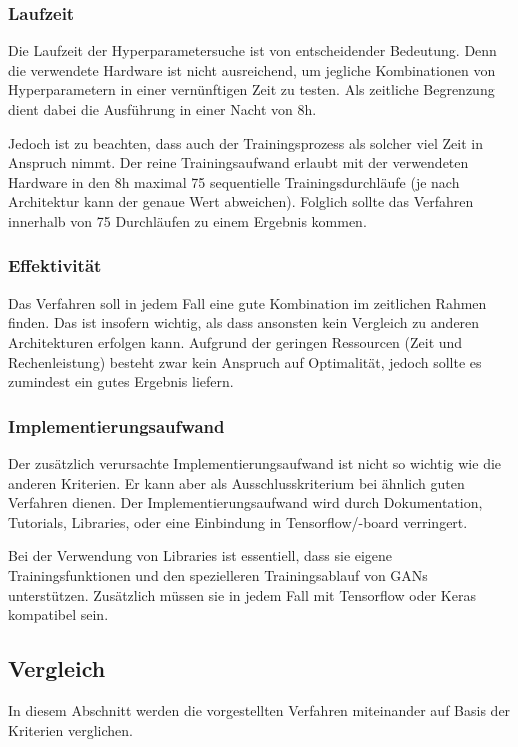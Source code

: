 \subsubsection{Laufzeit}
Die Laufzeit der Hyperparametersuche ist von entscheidender Bedeutung.
Denn die verwendete Hardware ist nicht ausreichend, um jegliche Kombinationen von Hyperparametern in einer vernünftigen Zeit zu testen.
Als zeitliche Begrenzung dient dabei die Ausführung in einer Nacht von 8h.
\newline

Jedoch ist zu beachten, dass auch der Trainingsprozess als solcher viel Zeit in Anspruch nimmt.
Der reine Trainingsaufwand erlaubt mit der verwendeten Hardware in den 8h maximal 75 sequentielle Trainingsdurchläufe (je nach Architektur kann der genaue Wert abweichen).
Folglich sollte das Verfahren innerhalb von 75 Durchläufen zu einem Ergebnis kommen.

\subsubsection{Effektivität}
Das Verfahren soll in jedem Fall eine gute Kombination im zeitlichen Rahmen finden.
Das ist insofern wichtig, als dass ansonsten kein Vergleich zu anderen Architekturen erfolgen kann.
Aufgrund der geringen Ressourcen (Zeit und Rechenleistung) besteht zwar kein Anspruch auf Optimalität, jedoch sollte es zumindest ein gutes Ergebnis liefern.

\subsubsection{Implementierungsaufwand}
Der zusätzlich verursachte Implementierungsaufwand ist nicht so wichtig wie die anderen Kriterien.
Er kann aber als Ausschlusskriterium bei ähnlich guten Verfahren dienen.
Der Implementierungsaufwand wird durch Dokumentation, Tutorials, Libraries, oder eine Einbindung in Tensorflow/-board verringert.

Bei der Verwendung von Libraries ist essentiell, dass sie eigene Trainingsfunktionen und den spezielleren Trainingsablauf von GANs unterstützen.
Zusätzlich müssen sie in jedem Fall mit Tensorflow oder Keras kompatibel sein.

\subsection{Vergleich}
In diesem Abschnitt werden die vorgestellten Verfahren miteinander auf Basis der Kriterien verglichen.

